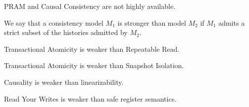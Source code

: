 \begin{corollary}
PRAM and Causal Consistency are not highly available.
\end{corollary}

\begin{definition}
\end{definition}

\begin{definition}
\end{definition}

\begin{definition}
\end{definition}

\begin{definition}
\end{definition}

\begin{definition}
\end{definition}

\begin{definition}
\end{definition}

\begin{definition}
\end{definition}

\begin{definition}
\end{definition}

\begin{definition}
\end{definition}

\begin{definition}
We say that a consistency model $M_1$ is stronger than model $M_2$ if
$M_1$ admits a strict subset of the histories admitted by $M_2$.
\end{definition}

\begin{observation}
Transactional Atomicity is weaker than Repeatable Read.
\end{observation}

\begin{observation}
Transactional Atomicity is weaker than Snapshot Isolation.
\end{observation}

\begin{observation}
Causality is weaker than linearizability.
\end{observation}

\begin{observation}
Read Your Writes is weaker than safe register semantics.
\end{observation}

